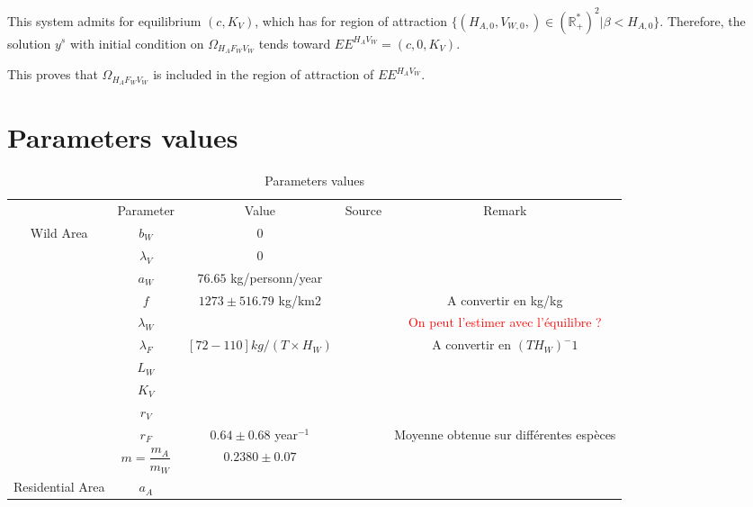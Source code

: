 \documentclass{article}
\newcommand{\lfw}{\lambda_{F}}
\newcommand{\lvw}{\lambda_{V}}
\newcommand{\lfv}{\lambda_{W}}
\newcommand{\marc}[1]{\textcolor{red}{#1}}
\begin{document}
This system admits for equilibrium $(c, K_V)$, which has for region of attraction $\Big\{(H_{A, 0}, V_{W, 0},) \in (\mathbb{R}_+^*)^2 | \beta < H_{A, 0} \Big\}$.  Therefore, the solution $y^s$ with initial condition on $\Omega_{H_AF_WV_W}$ tends toward $EE^{H_AV_W} = (c, 0, K_V)$.


This proves that $\Omega_{H_AF_WV_W}$ is included in the region of attraction of $EE^{H_AV_W}$.

\newpage

\section{Parameters values}

\begin{table}[!ht]
\centering
\caption{Parameters values}
\begin{tabular}{c|c|c|c|c}
& Parameter & Value & Source & Remark \\
\cline{1-5}
\multirow{10}{*}{Wild Area} & $b_W$ & 0 \cite{loung_pygmees_1996, koppert_consommation_1996, bennett_carrying_2000} & \\
& $\lvw$ & 0 & \cite{loung_pygmees_1996, koppert_consommation_1996, bennett_carrying_2000} &\\
& $a_W$ & $76.65$ kg/personn/year & \cite{koppert_consommation_1996, bennett_carrying_2000} \\
& $f$ & $1273 \pm 516.79$ kg/km2 & \cite{bennett_carrying_2000} & A convertir en kg/kg\\
& $\lfv$ & & & \marc{On peut l'estimer avec l'équilibre ?}\\
& $\lfw$ & $[72-110] kg/(T\times H_W)$ &\cite{avila_interpreting_2019, jones_consequences_2020} & A convertir en $(T H_W)^-1$\\
& $L_W$ \\
& $K_V$ \\
& $r_V$ \\
& $r_F$ & $0.64 \pm 0.68$ year$^{-1}$ & \cite{bennett_carrying_2000} & Moyenne obtenue sur différentes espèces\\
& $m= \dfrac{m_A}{m_W}$ & $0.2380 \pm 0.07$ & \cite{avila_interpreting_2019} \\
\hline
\multirow{1}{*}{Residential Area} & $a_A$ & 
\end{tabular}
\end{table}
\end{document}
